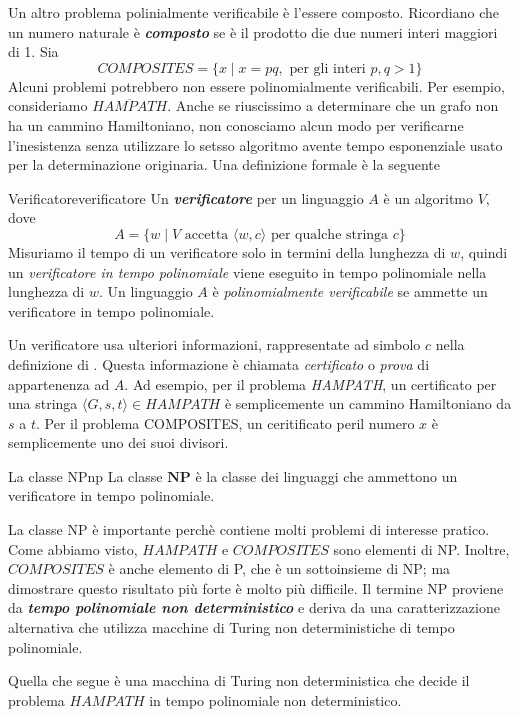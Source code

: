\documentclass[12pt]{report}
\newcounter{definition}
\newcommand{\namerefl}[1]{%
	\bgroup
	\let\nmu\MakeLowercase
	\nameref{#1}\egroup}
\newcommand{\nmu}{}
\begin{document}
Un altro problema polinialmente verificabile è l'essere composto. Ricordiano che un numero naturale è \textbf{\textit{composto}} se è il prodotto die due numeri interi maggiori di 1. Sia
\[
COMPOSITES = \{x \mid x = pq, \text{ per gli interi } p,q > 1\}
\]
Alcuni problemi potrebbero non essere polinomialmente verificabili. Per esempio, consideriamo $\overline{HAMPATH}$. Anche se riuscissimo a determinare che un grafo non ha un cammino Hamiltoniano, non conosciamo alcun modo per verificarne l'inesistenza senza utilizzare lo setsso algoritmo avente tempo esponenziale usato per la determinazione originaria. Una definizione formale è la seguente
\begin{definition}{\nmu Verificatore}{verificatore}
	Un \textbf{\textit{verificatore}} per un linguaggio $A$ è un algoritmo $V$, dove
	\[
	A = \{w \mid V \text{ accetta }\langle w, c \rangle \text{ per qualche stringa } c\}
	\]
	Misuriamo il tempo di un verificatore solo in termini della lunghezza di $w$, quindi un \textit{verificatore in tempo polinomiale} viene eseguito in tempo polinomiale nella lunghezza di $w$. Un linguaggio $A$ è \textit{polinomialmente verificabile}  se ammette un verificatore in tempo polinomiale.
\end{definition}
Un verificatore usa ulteriori informazioni, rappresentate ad simbolo $c$ nella definizione di \namerefl{def:verificatore}. Questa informazione è chiamata \textit{certificato} o \textit{prova} di appartenenza ad $A$.
Ad esempio, per il problema \textit{HAMPATH}, un certificato per una stringa $\langle G, s, t \rangle \in HAMPATH$ è semplicemente un cammino Hamiltoniano da $s$ a $t$. Per il problema COMPOSITES, un ceritificato peril numero $x$ è semplicemente uno dei suoi divisori.
\begin{definition}{\nmu La classe NP}{np}
	La classe $\mathbf{NP}$ è la classe dei linguaggi che ammettono un verificatore in tempo polinomiale.
\end{definition}
La classe NP è importante perchè contiene molti problemi di interesse pratico. Come abbiamo visto, $HAMPATH$ e $COMPOSITES$ sono elementi di NP. Inoltre, $COMPOSITES$ è anche elemento di P, che è un sottoinsieme di NP; ma dimostrare questo risultato più forte è molto più difficile. Il termine NP proviene da \textbf{\textit{tempo polinomiale non deterministico}} e deriva da una caratterizzazione alternativa che utilizza macchine di Turing non deterministiche di tempo polinomiale.

Quella che segue è una macchina di Turing non deterministica che decide il problema $HAMPATH$ in tempo polinomiale non deterministico.
\end{document}
